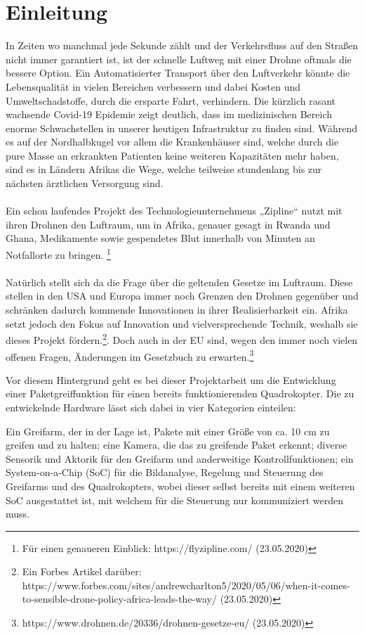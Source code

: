 \chapter{Einleitung}
In Zeiten wo manchmal jede Sekunde zählt und der Verkehrsfluss auf den Straßen nicht immer garantiert ist, ist der schnelle Luftweg mit einer Drohne oftmals die bessere Option. Ein Automatisierter Transport über den Luftverkehr könnte die Lebensqualität in vielen Bereichen verbessern und dabei Kosten und Umweltschadstoffe, durch die ersparte Fahrt, verhindern. Die kürzlich rasant wachsende Covid-19 Epidemie zeigt deutlich, dass im medizinischen Bereich enorme Schwachstellen in unserer heutigen Infrastruktur zu finden sind. Während es auf der Nordhalbkugel vor allem die Krankenhäuser sind, welche durch die pure Masse an erkrankten Patienten keine weiteren Kapazitäten mehr haben, sind es in Ländern Afrikas die Wege, welche teilweise stundenlang bis zur nächsten ärztlichen Versorgung sind.\\
\\
Ein schon laufendes Projekt des Technologieunternehmens „Zipline“ nutzt mit ihren Drohnen den Luftraum, um in Afrika, genauer gesagt in Rwanda und Ghana, Medikamente sowie gespendetes Blut innerhalb von Minuten an Notfallorte zu bringen. \footnote[1]{Für einen genaueren Einblick: https://flyzipline.com/ (23.05.2020)}\\
\\
Natürlich stellt sich da die Frage über die geltenden Gesetze im Luftraum. Diese stellen in den USA und Europa immer noch Grenzen den Drohnen gegenüber und schränken dadurch kommende Innovationen in ihrer Realisierbarkeit ein. Afrika setzt jedoch den Fokus auf Innovation und vielversprechende Technik, weshalb sie dieses Projekt fördern.\footnote[2]{Ein Forbes Artikel darüber: https://www.forbes.com/sites/andrewcharlton5/2020/05/06/when-it-comes-to-sensible-drone-policy-africa-leads-the-way/ (23.05.2020)}. Doch auch in der EU sind, wegen den immer noch vielen offenen Fragen, Änderungen im Gesetzbuch zu erwarten.\footnote[3]{https://www.drohnen.de/20336/drohnen-gesetze-eu/ (23.05.2020)} 

Vor diesem Hintergrund geht es bei dieser Projektarbeit um die Entwicklung einer Paketgreiffunktion für einen
bereits funktionierenden Quadrokopter. Die zu entwickelnde Hardware lässt sich dabei
in vier Kategorien einteilen: 

Ein Greifarm, der in der Lage ist, Pakete mit einer Größe
von ca. 10 cm zu greifen und zu halten; eine Kamera, die das zu greifende Paket
erkennt; diverse Sensorik und Aktorik für den Greifarm und anderweitige
Kontrollfunktionen; ein System-on-a-Chip (SoC) für die Bildanalyse, Regelung und
Steuerung des Greifarms und des Quadrokopters, wobei dieser selbst bereits mit
einem weiteren SoC ausgestattet ist, mit welchem für die Steuerung nur kommuniziert
werden muss.